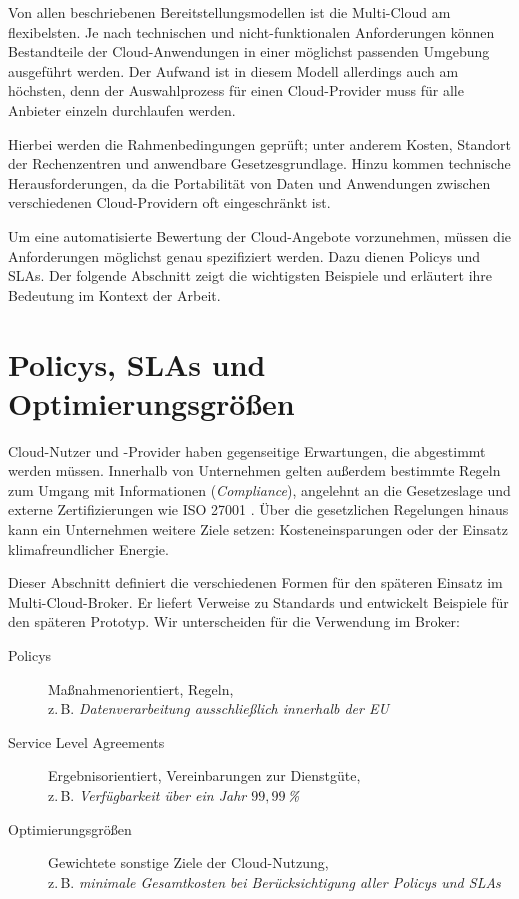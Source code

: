 Von allen beschriebenen Bereitstellungsmodellen ist die Multi-Cloud am flexibelsten. Je nach technischen und nicht-funktionalen Anforderungen können Bestandteile der Cloud-Anwendungen in einer möglichst passenden Umgebung ausgeführt werden. Der Aufwand ist in diesem Modell allerdings auch am höchsten, denn der Auswahlprozess für einen Cloud-Provider muss für alle Anbieter einzeln durchlaufen werden.

Hierbei werden die Rahmenbedingungen geprüft; unter anderem Kosten, Standort der Rechenzentren und anwendbare Gesetzesgrundlage. Hinzu kommen technische Herausforderungen, da die Portabilität von Daten und Anwendungen zwischen verschiedenen Cloud-Providern oft eingeschränkt ist.

Um eine automatisierte Bewertung der Cloud-Angebote vorzunehmen, müssen die Anforderungen möglichst genau spezifiziert werden. Dazu dienen Policys und SLAs. Der folgende Abschnitt zeigt die wichtigsten Beispiele und erläutert ihre Bedeutung im Kontext der Arbeit.


\section{Policys, SLAs und Optimierungsgrößen}

Cloud-Nutzer und -Provider haben gegenseitige Erwartungen, die abgestimmt werden müssen. Innerhalb von Unternehmen gelten außerdem bestimmte Regeln zum Umgang mit Informationen (\emph{Compliance}), angelehnt an die Gesetzeslage und externe Zertifizierungen wie ISO 27001 \cite{iso:2013:27001}. Über die gesetzlichen Regelungen hinaus kann ein Unternehmen weitere Ziele setzen: Kosteneinsparungen oder der Einsatz klimafreundlicher Energie.

Dieser Abschnitt definiert die verschiedenen Formen für den späteren Einsatz im Multi-Cloud-Broker. Er liefert Verweise zu Standards und entwickelt Beispiele für den späteren Prototyp. Wir unterscheiden für die Verwendung im Broker:

\newpage

\begin{description}
	\item[Policys] Maßnahmenorientiert, Regeln, \\
	z.\,B. \emph{Datenverarbeitung ausschließlich innerhalb der EU}
	\item[Service Level Agreements] Ergebnisorientiert, Vereinbarungen zur Dienstgüte, \\
	z.\,B. \emph{Verfügbarkeit über ein Jahr $99,99\,$\%}
	\item[Optimierungsgrößen] Gewichtete sonstige Ziele der Cloud-Nutzung, \\
	z.\,B. \emph{minimale Gesamtkosten bei Berücksichtigung aller Policys und SLAs}
\end{description}

